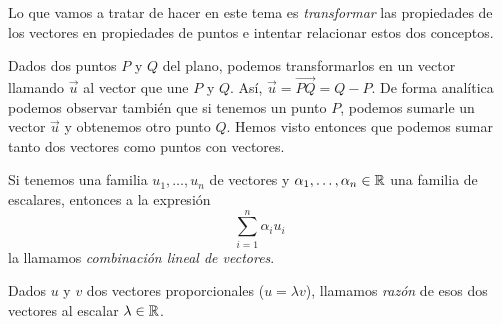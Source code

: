 Lo que vamos a tratar de hacer en este tema es \textit{transformar} las propiedades de los vectores en propiedades de puntos e intentar relacionar estos dos conceptos.

\begin{minipage}[b]{0.45\textwidth}
  Dados dos puntos $P$ y $Q$ del plano, podemos transformarlos en un vector llamando $\vec{u}$ al vector que une $P$ y $Q$. Así, $\vec{u} = \overrightarrow{PQ} = Q-P$. De forma analítica podemos observar también que si tenemos un punto $P$, podemos sumarle un vector $\vec{u}$ y obtenemos otro punto $Q$. Hemos visto entonces que podemos sumar tanto dos     vectores como puntos con vectores.
\end{minipage} \hfill
\begin{minipage}[b]{0.45\textwidth}
\end{minipage}
\begin{ndef}
  Si tenemos una familia $u_1,\ldots , u_n$ de vectores y $\alpha_1,\ldots, \alpha_n \in \mathbb{R}$ una familia de escalares, entonces a la expresión
  \[
    \sum_{i=1}^n \alpha_i u_i
  \]
  la llamamos \textit{combinación lineal de vectores}.
\end{ndef}

\begin{ndef}
  Dados $u$ y $v$ dos vectores proporcionales ($u = \lambda v$), llamamos \textit{razón} de esos dos vectores al escalar $\lambda \in \mathbb{R}$.
\end{ndef}

